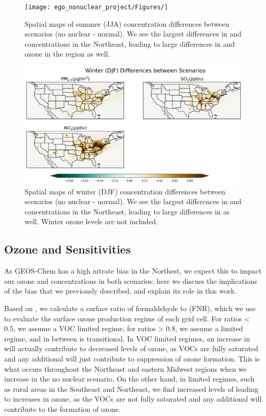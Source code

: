 \documentclass[12]{article}
\begin{document}
\begin{figure}
    \centering
    \texttt{[image: ego\_nonuclear\_project/Figures/]}
    \caption{Spatial maps of summer (JJA) concentration differences between scenarios (no nuclear - normal). We see the largest differences in  and  concentrations in the Northeast, leading to large differences in  and ozone in the region as well.} 
    \label{fig:summer_winter_dif}
\end{figure}
\begin{figure}
    \centering
    \includegraphics[scale=0.4]{ego_nonuclear_project/Figures/winter_national_dif.png}
    \caption{Spatial maps of winter (DJF) concentration differences between scenarios (no nuclear - normal). We see the largest differences in  and  concentrations in the Northeast, leading to large differences in  as well. Winter ozone levels are not included.} 
    \label{fig:winter_dif}
\end{figure}

\subsection{Ozone and  Sensitivities}
As GEOS-Chem has a high nitrate bias in the Northest, we expect this to impact our ozone and  concentrations in both scenarios; here we discuss the implications of the bias that we previously described, and explain its role in this work. 

Based on \cite{jin_evaluating_2017}, we calculate a surface ratio of formaldehyde to  (FNR), which we use to evaluate the surface ozone production regime of each grid cell. For ratios < 0.5, we assume a VOC limited regime, for ratios > 0.8, we assume a  limited regime, and in between is transitional. In VOC limited regimes, an increase in  will actually contribute to decreased levels of ozone, as VOCs are fully saturated and any additional  will just contribute to suppression of ozone formation. This is what occurs throughout the Northeast and eastern Midwest regions when we increase  in the no nuclear scenario. On the other hand, in  limited regimes, such as rural areas in the Southeast and Northeast, we find increased levels of  leading to increases in ozone, as the VOCs are not fully saturated and any additional  will contribute to the formation of ozone. 
\end{document}
